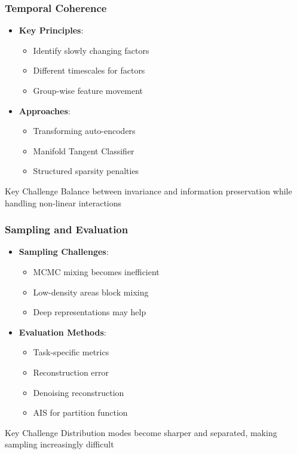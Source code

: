 \documentclass{beamer}
\begin{document}
\begin{frame}
\frametitle{Temporal Coherence}
\begin{itemize}
\item \textbf{Key Principles}:
    \begin{itemize}
    \item Identify slowly changing factors
    \item Different timescales for factors
    \item Group-wise feature movement
    \end{itemize}
\item \textbf{Approaches}:
    \begin{itemize}
    \item Transforming auto-encoders
    \item Manifold Tangent Classifier
    \item Structured sparsity penalties
    \end{itemize}
\end{itemize}

\begin{alertblock}{Key Challenge}
Balance between invariance and information preservation while handling non-linear interactions
\end{alertblock}
\end{frame}

\begin{frame}
\frametitle{Sampling and Evaluation}
\begin{itemize}
\item \textbf{Sampling Challenges}:
    \begin{itemize}
    \item MCMC mixing becomes inefficient
    \item Low-density areas block mixing
    \item Deep representations may help
    \end{itemize}
\item \textbf{Evaluation Methods}:
    \begin{itemize}
    \item Task-specific metrics
    \item Reconstruction error
    \item Denoising reconstruction
    \item AIS for partition function
    \end{itemize}
\end{itemize}

\begin{alertblock}{Key Challenge}
Distribution modes become sharper and separated, making sampling increasingly difficult
\end{alertblock}
\end{frame}
\end{document}
